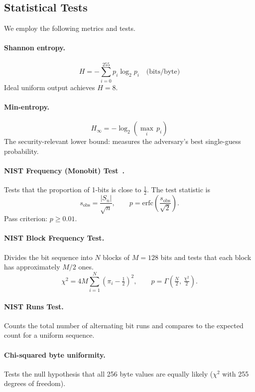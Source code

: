 \documentclass[10pt,twocolumn]{article}
\begin{document}
\subsection{Statistical Tests}

We employ the following metrics and tests.

\paragraph{Shannon entropy.}
\[
  H = -\sum_{i=0}^{255} p_i \log_2 p_i \quad \text{(bits/byte)}
\]
Ideal uniform output achieves $H = 8$.

\paragraph{Min-entropy.}
\[
  H_\infty = -\log_2\!\left(\max_i\, p_i\right)
\]
The security-relevant lower bound: measures the adversary's best
single-guess probability.

\paragraph{NIST Frequency (Monobit) Test~\cite{nist80022}.}
Tests that the proportion of 1-bits is close to $\frac{1}{2}$.
The test statistic is
\[
  s_\text{obs} = \frac{|S_n|}{\sqrt{n}}, \qquad
  p = \mathrm{erfc}\!\left(\frac{s_\text{obs}}{\sqrt{2}}\right).
\]
Pass criterion: $p \geq 0.01$.

\paragraph{NIST Block Frequency Test.}
Divides the bit sequence into $N$ blocks of $M = 128$ bits and tests
that each block has approximately $M/2$ ones.
\[
  \chi^2 = 4M \sum_{i=1}^{N}\!\left(\pi_i - \tfrac{1}{2}\right)^2, \qquad
  p = \Gamma\!\left(\tfrac{N}{2},\, \tfrac{\chi^2}{2}\right).
\]

\paragraph{NIST Runs Test.}
Counts the total number of alternating bit runs and compares to the
expected count for a uniform sequence.

\paragraph{Chi-squared byte uniformity.}
Tests the null hypothesis that all 256 byte values are equally likely
($\chi^2$ with 255 degrees of freedom).
\end{document}
